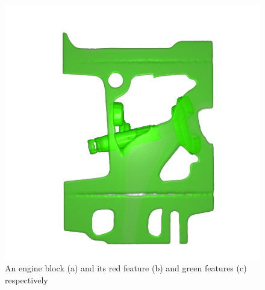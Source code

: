 \begin{figure}
\begin{minipage}{.33\textwidth}
		\subcaption{}
	\end{minipage}~
	\begin{minipage}{.33\textwidth}
		\includegraphics[width=1\linewidth]{images/engine_naive_2}
		\subcaption{}
	\end{minipage}
	\caption{An engine block (a) and its red feature (b) and green features (c) respectively}
	\label{fig:engine_naive}
\end{figure}

